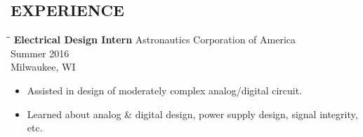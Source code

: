 \documentclass[letterpaper]{res}
\begin{document}
\begin{resume}

  \section{EXPERIENCE}
  \vspace{-0.15in}
  \begin{tabbing}
    \hspace{2.3in}\= \hspace{2.6in}\= \kill %
    {\bf Electrical Design Intern} \>Astronautics Corporation of America \> ~~~~~~ Summer 2016\\
    \> Milwaukee, WI
  \end{tabbing}\vspace{-10pt}
  \begin{itemize} \itemsep1pt \parskip0pt 
    \item Assisted in design of moderately complex analog/digital circuit.
    \item Learned about analog \& digital design, power supply design, signal integrity, etc.
  \end{itemize}


\end{resume}
\end{document}

